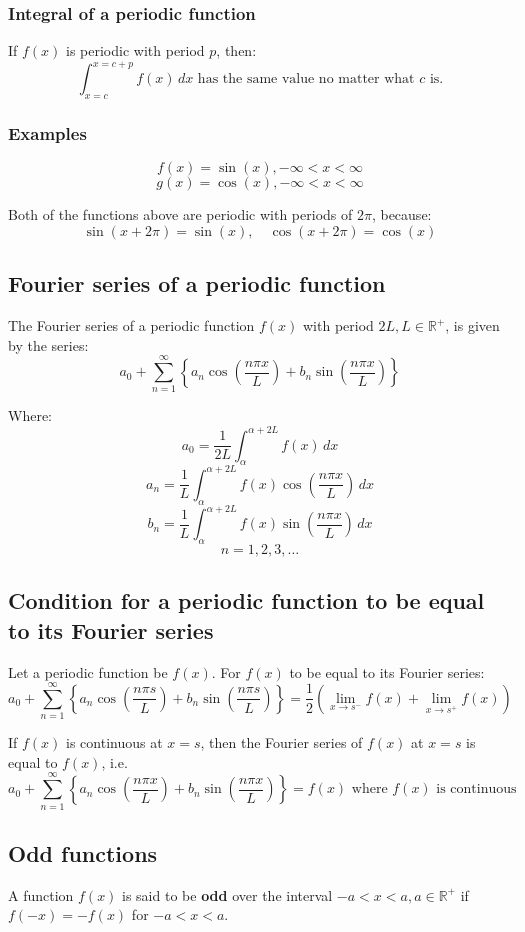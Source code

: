 \documentclass[11pt]{article}
\begin{document}
\subsubsection{Integral of a periodic function}
\label{sec:org2871b97}
If \(f(x)\) is periodic with period \(p\), then:
\[\int_{x = c}^{x = c + p} f(x) \, dx \text{ has the same value no matter what } c \text{ is.}\]
\subsubsection{Examples}
\label{sec:org6e44449}
\[f(x) = \sin (x), - \infty < x < \infty\]
\[g(x) = \cos (x), - \infty < x < \infty\]

Both of the functions above are periodic with periods of \(2 \pi\), because:
\[\sin(x + 2 \pi) = \sin (x), \quad \cos (x + 2 \pi) = \cos (x)\]
\subsection{Fourier series of a periodic function}
\label{sec:org5a6a23f}
The Fourier series of a periodic function \(f(x)\) with period \(2L, L \in \mathbb{R}^+\), is given by the series:
\[a_0 + \sum_{n = 1}^{\infty} \left\{a_n \cos \left( \frac{n \pi x}{L} \right) + b_n \sin \left( \frac{n \pi x}{L} \right) \right\}\]

Where:
\[a_0 = \frac{1}{2L} \int_{\alpha}^{\alpha + 2L} f(x) \, dx\]
\[a_n = \frac{1}{L} \int_{\alpha}^{\alpha + 2L} f(x) \cos \left( \frac{n \pi x}{L} \right) \, dx\]
\[b_n = \frac{1}{L} \int_{\alpha}^{\alpha + 2L} f(x) \sin \left( \frac{n \pi x}{L} \right) \, dx\]
\[n = 1, 2, 3, \ldots\]
\subsection{Condition for a periodic function to be equal to its Fourier series}
\label{sec:org4c7c556}
Let a periodic function be \(f(x)\). For \(f(x)\) to be equal to its Fourier series:
\[a_0 + \sum_{n = 1}^{\infty} \left\{a_n \cos \left( \frac{n \pi s}{L} \right) + b_n \sin \left( \frac{n \pi s}{L} \right) \right\} = \frac{1}{2} \left( \lim_{x \rightarrow s^{-}} f(x) + \lim_{x \rightarrow s^{+}} f(x) \right)\]

If \(f(x)\) is continuous at \(x = s\), then the Fourier series of \(f(x)\) at \(x = s\) is equal to \(f(x)\), i.e.
\[a_0 + \sum_{n = 1}^{\infty} \left\{a_n \cos \left( \frac{n \pi x}{L} \right) + b_n \sin \left( \frac{n \pi x}{L} \right) \right\} = f(x) \text{ where } f(x) \text{ is continuous}\]
\subsection{Odd functions}
\label{sec:org297628a}
A function \(f(x)\) is said to be \textbf{odd} over the interval \(- a < x < a, a \in \mathbb{R}^{+}\) if \(f(-x) = - f(x)\) for \(-a < x < a\).  \\
\end{document}
